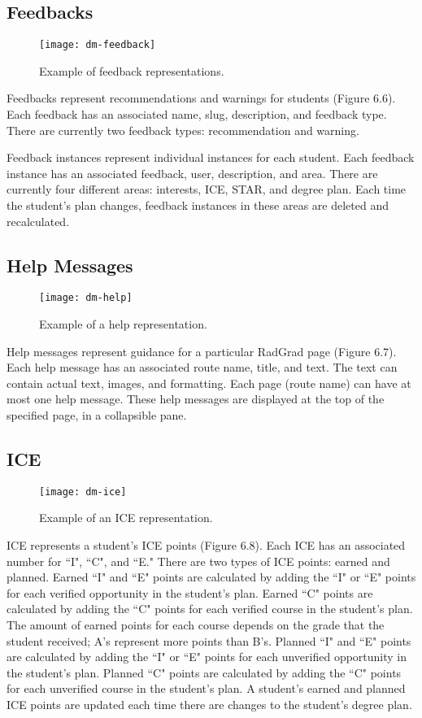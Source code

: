 \subsection{Feedbacks}
\begin{figure}[h]
\centering
\texttt{[image: dm-feedback]}
\caption{Example of feedback representations.}
\end{figure}
Feedbacks represent recommendations and warnings for students (Figure 6.6). Each feedback has an associated name, slug, description, and feedback type. There are currently two feedback types: recommendation and warning. 

Feedback instances represent individual instances for each student. Each feedback instance has an associated feedback, user, description, and area. There are currently four different areas: interests, ICE, STAR, and degree plan. Each time the student's plan changes, feedback instances in these areas are deleted and recalculated.

\subsection{Help Messages}
\begin{figure}[h]
\centering
\texttt{[image: dm-help]}
\caption{Example of a help representation.}
\end{figure}
Help messages represent guidance for a particular RadGrad page (Figure 6.7). Each help message has an associated route name, title, and text. The text can contain actual text, images, and formatting. Each page (route name) can have at most one help message. These help messages are displayed at the top of the specified page, in a collapsible pane.  

\subsection{ICE}
\begin{figure}[h]
\centering
\texttt{[image: dm-ice]}
\caption{Example of an ICE representation.}
\end{figure}
ICE represents a student's ICE points (Figure 6.8). Each ICE has an associated number for ``I", ``C", and ``E." There are two types of ICE points: earned and planned. Earned ``I" and ``E" points are calculated by adding the ``I" or ``E" points for each verified opportunity in the student's plan. Earned ``C" points are calculated by adding the ``C" points for each verified course in the student's plan. The amount of earned points for each course depends on the grade that the student received; A's represent more points than B's. Planned ``I" and ``E" points are calculated by adding the ``I" or ``E" points for each unverified opportunity in the student's plan. Planned ``C" points are calculated by adding the ``C" points for each unverified course in the student's plan. A student's earned and planned ICE points are updated each time there are changes to the student's degree plan. 

